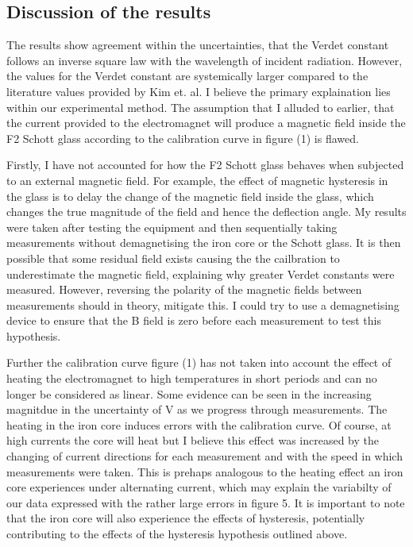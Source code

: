 \documentclass{article}%
\begin{document}
\subsection{Discussion of the results} 
The results show agreement within the uncertainties, that the Verdet constant follows an inverse square law with the wavelength of incident radiation. However, the values for the Verdet constant are systemically larger compared to the literature values provided by Kim et. al. \cite{Kim}
I believe the primary explaination lies within our experimental method. The assumption that I alluded to earlier, that the current provided to the electromagnet will produce a magnetic field inside the F2 Schott glass according to the calibration curve in figure (1) is flawed.

Firstly, I have not accounted for how the F2 Schott glass behaves when subjected to an external magnetic field. For example, the effect of magnetic hysteresis in the glass is to delay the change of the magnetic field inside the glass, which changes the true magnitude of the field and hence the deflection angle.
My results were taken after testing the equipment and then sequentially taking measurements without demagnetising the iron core or the Schott glass. It is then possible that some residual field exists causing the the cailbration to underestimate the magnetic field, explaining why greater Verdet constants were measured.
However, reversing the polarity of the magnetic fields between measurements should in theory, mitigate this. I could try to use a demagnetising device to ensure that the B field is zero before each measurement to test this hypothesis.

Further the calibration curve figure (1) has not taken into account the effect of heating the electromagnet to high temperatures in short periods and can no longer be considered as linear.
Some evidence can be seen in the increasing magnitdue in the uncertainty of V as we progress through measurements. The heating in the iron core induces errors with the calibration curve. Of course, at high currents the core will heat but I believe this effect was increased by the changing of current directions for each measurement and with the speed in which measurements were taken. 
This is prehaps analogous to the heating effect an iron core experiences under alternating current, which may explain the variabilty of our data expressed with the rather large errors in figure 5. It is important to note that the iron core will also experience the effects of hysteresis, potentially contributing to the effects of the hysteresis hypothesis outlined above. 
\end{document}
